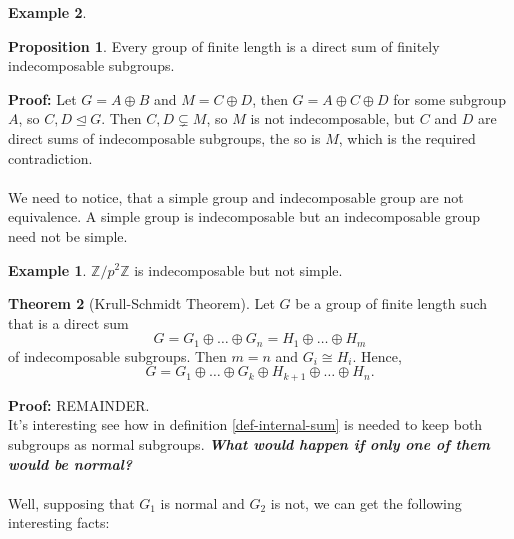 \documentclass[11pt]{amsbook}%
\theoremstyle{plain}
\theoremstyle{definition}
\newtheorem*{example*}{Example}
\newtheorem{proposition}[theorem]{Proposition}
\newtheorem{theorem}{Theorem}
\numberwithin{equation}{section}
\newcommand{\ZZ}{\mathbb Z}
\newcommand{\leftnormal}{\trianglelefteq}
\begin{document}
\begin{example*}
\begin{proposition}
  Every group of finite length is a direct sum of finitely indecomposable subgroups.
\end{proposition} \vspace{1.8em}
\textbf{Proof: }Let $G = A \oplus B$ and $M = C \oplus D$, then $G = A \oplus C \oplus D$
for some subgroup $A$, so $C, D \leftnormal G$. Then $C, D \subsetneq M$, so $M$
is not indecomposable, but $C$ and $D$ are direct sums of indecomposable subgroups,
the so is $M$, which is the required contradiction. \qedsymbol \\ \\
We need to notice, that a simple group and indecomposable group are not equivalence.
A simple group is indecomposable but an indecomposable group need not be simple.
\begin{example*}
  $\ZZ/p^{2}\ZZ$ is indecomposable but not simple.
\end{example*}

\begin{theorem}[Krull-Schmidt Theorem]
  \label{theo-krull-schmidt}
  Let $G$ be a group of finite length such that is a direct sum
  $$
  G = G_{1} \oplus \dots \oplus G_{n} = H_{1} \oplus \dots \oplus H_{m}
  $$
  of indecomposable subgroups. Then $m = n$ and $G_{i} \cong H_{i}$. Hence,
  $$
  G = G_{1} \oplus \dots \oplus G_{k} \oplus H_{k+1} \oplus \dots \oplus H_{n}.
  $$
\end{theorem} \vspace{1.8em}
\textbf{Proof: } REMAINDER. \\

It's interesting see how in definition \ref{def-internal-sum} is needed
to keep both subgroups as normal subgroups. \textit{\textbf{What would happen if only one of them would be normal?}} \\ \\
Well, supposing that $G_{1}$ is normal and $G_{2}$ is not, we can get the following interesting facts: \\


\end{example*}
\end{document}
